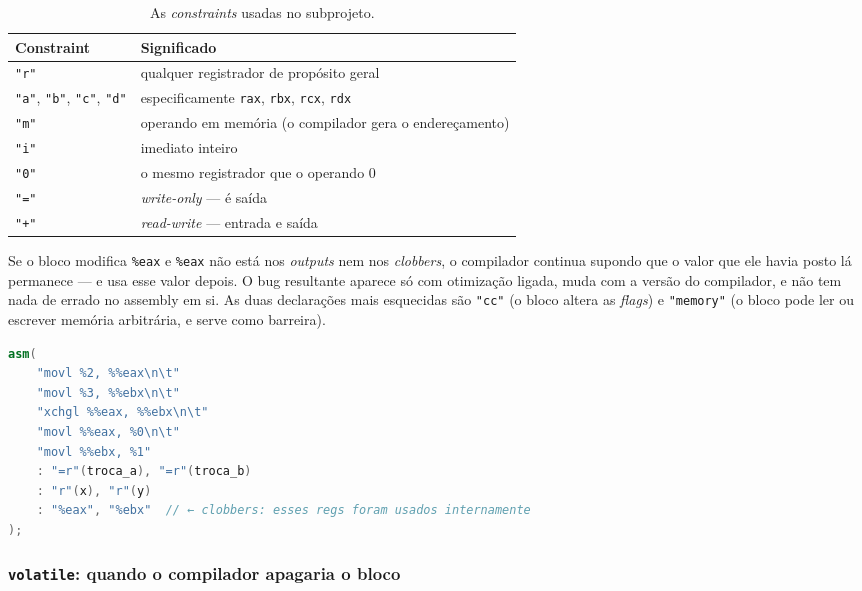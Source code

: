 \begin{table}[htbp]
\centering
\caption{As \emph{constraints} usadas no subprojeto.}
\label{tab:constraints-asm}
\footnotesize
\begin{tabular}{@{}ll@{}}
\toprule
\textbf{Constraint} & \textbf{Significado} \\
\midrule
\texttt{"r"} & qualquer registrador de propósito geral \\
\texttt{"a"}, \texttt{"b"}, \texttt{"c"}, \texttt{"d"} & especificamente \texttt{rax}, \texttt{rbx}, \texttt{rcx}, \texttt{rdx} \\
\texttt{"m"} & operando em memória (o compilador gera o endereçamento) \\
\texttt{"i"} & imediato inteiro \\
\texttt{"0"} & o mesmo registrador que o operando 0 \\
\texttt{"="} & \emph{write-only} --- é saída \\
\texttt{"+"} & \emph{read-write} --- entrada e saída \\
\bottomrule
\end{tabular}
\end{table}

\begin{armadilha}
Se o bloco modifica \texttt{\%eax} e \texttt{\%eax} não está nos \emph{outputs}
nem nos \emph{clobbers}, o compilador continua supondo que o valor que ele havia
posto lá permanece --- e usa esse valor depois. O bug resultante aparece só com
otimização ligada, muda com a versão do compilador, e não tem nada de errado no
assembly em si. As duas declarações mais esquecidas são \texttt{"cc"} (o bloco
altera as \emph{flags}) e \texttt{"memory"} (o bloco pode ler ou escrever
memória arbitrária, e serve como barreira).
\end{armadilha}

\begin{lstlisting}[style=bt, language=C++,
    caption={Os registradores usados internamente declarados como \emph{clobbers}.}]
asm(
    "movl %2, %%eax\n\t"
    "movl %3, %%ebx\n\t"
    "xchgl %%eax, %%ebx\n\t"
    "movl %%eax, %0\n\t"
    "movl %%ebx, %1"
    : "=r"(troca_a), "=r"(troca_b)
    : "r"(x), "r"(y)
    : "%eax", "%ebx"  // ← clobbers: esses regs foram usados internamente
);
\end{lstlisting}

\subsubsection{\texttt{volatile}: quando o compilador apagaria o bloco}

